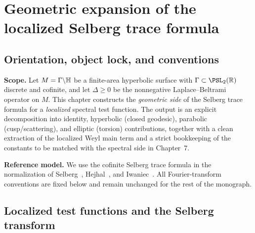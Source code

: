 
\chapter{Geometric expansion of the localized Selberg trace formula}
\label{ch:selberg-geometric-localized}

\section*{Orientation, object lock, and conventions}\label{sec:ch6-orientation}

\noindent\textbf{Scope.}
Let $M=\Gamma\backslash\mathbb{H}$ be a finite-area hyperbolic surface with $\Gamma\subset\PSL_2(\R)$ discrete and cofinite,
and let $\Delta\ge 0$ be the nonnegative Laplace--Beltrami operator on $M$.
This chapter constructs the \emph{geometric side} of the Selberg trace formula for a \emph{localized} spectral test
function. The output is an explicit decomposition into identity, hyperbolic (closed geodesic), parabolic
(cusp/scattering), and elliptic (torsion) contributions, together with a clean extraction of the localized Weyl
main term and a strict bookkeeping of the constants to be matched with the spectral side in Chapter~7.

\medskip
\noindent\textbf{Reference model.}
We use the cofinite Selberg trace formula in the normalization of
Selberg~\cite{Selberg1956}, Hejhal~\cite[Vol.~I, Ch.~2]{Hejhal1983}, and Iwaniec~\cite{Iwaniec2002}.
All Fourier-transform conventions are fixed below and remain unchanged for the rest of the monograph.

\section{Localized test functions and the Selberg transform}
\label{sec:ch6-test-selberg}

